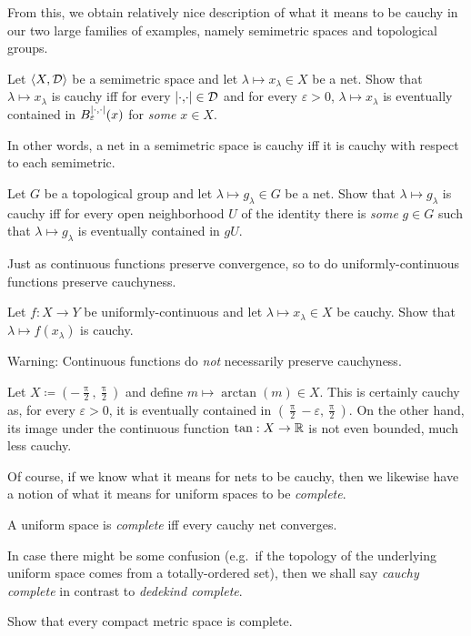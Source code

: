From this, we obtain relatively nice description of what it means to be cauchy in our two large families of examples, namely semimetric spaces and topological groups.
\begin{exr}\label{exr4.5.3x}
Let $\langle X,\mathcal{D}\rangle$ be a semimetric space and let $\lambda \mapsto x_\lambda \in X$ be a net.  Show that $\lambda \mapsto x_\lambda$ is cauchy iff for every $\metric \in \mathcal{D}$ and for every $\varepsilon >0$, $\lambda \mapsto x_\lambda$ is eventually contained in $B_{\varepsilon}^{\metric}(x)$ for \emph{some} $x\in X$.
\begin{rmk}
In other words, a net in a semimetric space is cauchy iff it is cauchy with respect to each semimetric.
\end{rmk}
\end{exr}
\begin{exr}
Let $G$ be a topological group and let $\lambda \mapsto g_\lambda \in G$ be a net.  Show that $\lambda \mapsto g_\lambda$ is cauchy iff for every open neighborhood $U$ of the identity there is \emph{some} $g\in G$ such that $\lambda \mapsto g_\lambda$ is eventually contained in $gU$.
\end{exr}

Just as continuous functions preserve convergence, so to do uniformly-continuous functions preserve cauchyness.
\begin{exr}\label{exr4.5.3}
Let $f:X\rightarrow Y$ be uniformly-continuous and let $\lambda \mapsto x_\lambda \in X$ be cauchy.  Show that $\lambda \mapsto f(x_\lambda)$ is cauchy.
\end{exr}
Warning:  Continuous functions do \emph{not} necessarily preserve cauchyness.
\begin{exm}
Let $X \coloneqq (-\frac{\uppi}{2},\frac{\uppi}{2})$ and define $m\mapsto \arctan (m)\in X$.  This is certainly cauchy as, for every $\varepsilon >0$, it is eventually contained in $(\frac{\uppi}{2}-\varepsilon ,\frac{\uppi}{2})$.  On the other hand, its image under the continuous function $\tan :X\rightarrow \mathbb{R}$ is not even bounded, much less cauchy.
\end{exm}

Of course, if we know what it means for nets to be cauchy, then we likewise have a notion of what it means for uniform spaces to be \emph{complete}.
\begin{dfn}[Completeness]\label{Completeness}
A uniform space is \emph{complete} iff every cauchy net converges.
\begin{rmk}
In case there might be some confusion (e.g.~if the topology of the underlying uniform space comes from a totally-ordered set), then we shall say \emph{cauchy complete} in contrast to \emph{dedekind complete}.
\end{rmk}
\end{dfn}
\begin{exr}
Show that every compact metric space is complete.
\end{exr}

